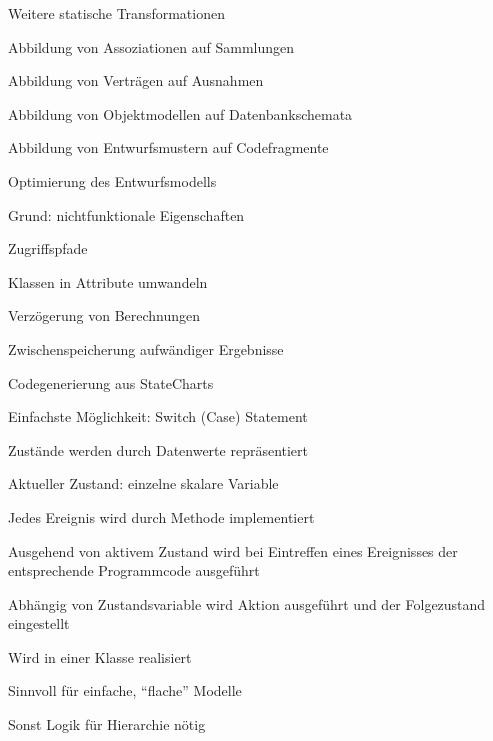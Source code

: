 \documentclass[a4paper]{article}
\begin{document}
\begin{multicols}{3}

  Weitere statische Transformationen
  \begin{itemize*}
    \item Abbildung von Assoziationen auf Sammlungen
    \item Abbildung von Verträgen auf Ausnahmen
    \item Abbildung von Objektmodellen auf Datenbankschemata
    \item Abbildung von Entwurfsmustern auf Codefragmente
  \end{itemize*}

  Optimierung des Entwurfsmodells
  \begin{itemize*}
    \item Grund: nichtfunktionale Eigenschaften
    \item Zugriffspfade
    \item Klassen in Attribute umwandeln
    \item Verzögerung von Berechnungen
    \item Zwischenspeicherung aufwändiger Ergebnisse
  \end{itemize*}

  Codegenerierung aus StateCharts
  \begin{itemize*}
    \item Einfachste Möglichkeit: Switch (Case) Statement
    \item Zustände werden durch Datenwerte repräsentiert
    \begin{itemize*}
      \item Aktueller Zustand: einzelne skalare Variable
    \end{itemize*}
    \item Jedes Ereignis wird durch Methode implementiert
    \item Ausgehend von aktivem Zustand wird bei Eintreffen eines Ereignisses der entsprechende Programmcode ausgeführt
    \item Abhängig von Zustandsvariable wird Aktion ausgeführt und der Folgezustand eingestellt
    \item Wird in einer Klasse realisiert
    \item Sinnvoll für einfache, “flache” Modelle
    \begin{itemize*}
      \item Sonst Logik für Hierarchie nötig
    \end{itemize*}
  \end{itemize*}


\end{multicols}
\end{document}
